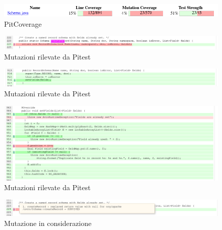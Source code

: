 \documentclass[10pt, a4paper]{article}
\begin{document}
  \begin{figure}
    \includegraphics[width=\linewidth]{./images/create_record/PitCoverage1.png}
    \caption{PitCoverage}
    \label{fig:PitMutationCreateRecord1}
  \end{figure}

  \begin{figure}
    \includegraphics[width=\linewidth]{./images/create_record/PitCoverage2.png}
    \caption{Mutazioni rilevate da Pitest}
    \label{fig:PitMutationCreateRecord2}
  \end{figure}

  \begin{figure}
    \includegraphics[width=\linewidth]{./images/create_record/PitCoverage3.png}
    \caption{Mutazioni rilevate da Pitest}
    \label{fig:PitMutationCreateRecord3}
  \end{figure}

  \begin{figure}
    \includegraphics[width=\linewidth]{./images/create_record/PitCoverage4.png}
    \caption{Mutazioni rilevate da Pitest}
    \label{fig:PitMutationCreateRecord4}
  \end{figure}
  \clearpage
  \begin{figure}
    \includegraphics[width=\linewidth]{./images/create_record/PitCoverage5.png}
    \caption{Mutazione in considerazione}
    \label{fig:PitMutationCreateRecord5}
  \end{figure}
\end{document}
